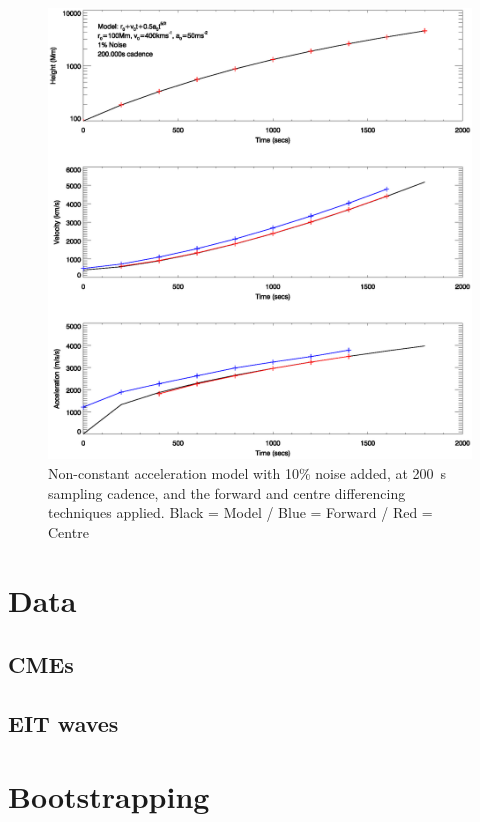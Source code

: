 \documentclass[namedreferences]{SolarPhysics}
\begin{document}
\begin{article}
\begin{figure}
 \centerline{\includegraphics[width=\linewidth]{images/nonconst_a_forward_centre_noise001_cadence200.ps}}
   \caption{Non-constant acceleration model with 10\% noise added, at 200~s sampling cadence, and the forward and centre differencing techniques applied. Black = Model / Blue = Forward / Red = Centre}
    \label{nonconst_a_forward_centre_noise001_cadence200}
\end{figure}

\section{Data}

\subsection{CMEs}

\subsection{EIT waves}

\section{Bootstrapping}


\end{article}
\end{document}

